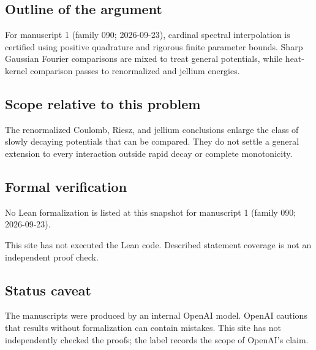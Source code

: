 \documentclass[11pt]{article}
\begin{document}
\subsection{Outline of the argument}
For manuscript 1 (family 090; 2026-09-23), cardinal spectral interpolation is certified using positive quadrature and rigorous finite parameter bounds. Sharp Gaussian Fourier comparisons are mixed to treat general potentials, while heat-kernel comparison passes to renormalized and jellium energies.

\subsection{Scope relative to this problem}
The renormalized Coulomb, Riesz, and jellium conclusions enlarge the class of slowly decaying potentials that can be compared. They do not settle a general extension to every interaction outside rapid decay or complete monotonicity.

\subsection{Formal verification}
No Lean formalization is listed at this snapshot for manuscript 1 (family 090; 2026-09-23).

This site has not executed the Lean code. Described statement coverage is not an independent proof check.

\subsection{Status caveat}
The manuscripts were produced by an internal OpenAI model. OpenAI cautions that results without formalization can contain mistakes. This site has not independently checked the proofs; the label records the scope of OpenAI's claim.
\end{document}

